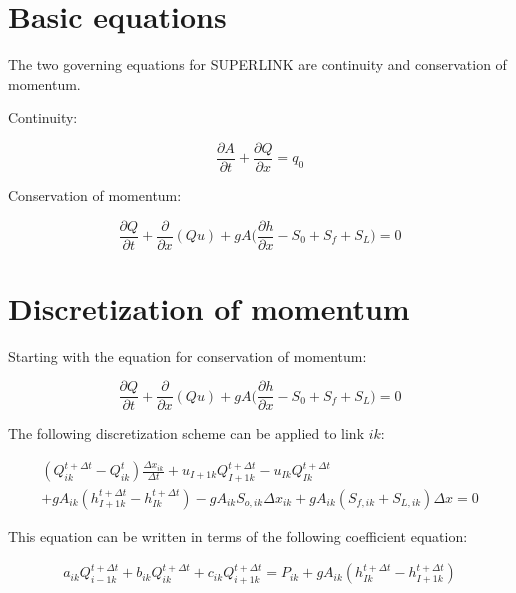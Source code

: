 \documentclass[11pt]{article}
\begin{document}
\clearpage

\section{Basic equations}

The two governing equations for SUPERLINK are continuity and conservation of momentum.

Continuity:

\begin{equation}
  \frac{\partial A}{\partial t} + \frac{\partial Q}{\partial x} = q_0
\end{equation}

Conservation of momentum:

\begin{equation}
  \frac{\partial Q}{\partial t} + \frac{\partial}{\partial x} (Q u) + g A \biggl(\frac{\partial h}{\partial x} - S_0 + S_f + S_L \biggr) = 0
\end{equation}

\section{Discretization of momentum}

Starting with the equation for conservation of momentum:

\begin{equation}
  \frac{\partial Q}{\partial t} + \frac{\partial}{\partial x} (Q u) + g A \biggl(\frac{\partial h}{\partial x} - S_0 + S_f + S_L \biggr) = 0
\end{equation}

The following discretization scheme can be applied to link $ik$:

\begin{equation}
  \begin{split}
    (Q_{ik}^{t + \Delta t} - Q_{ik}^t) \frac{\Delta x_{ik}}{\Delta t} + u_{I+1k}
    Q_{I + 1k}^{t + \Delta t} - u_{Ik} Q_{Ik}^{t + \Delta t} \\
    + g A_{ik} (h_{I+1k}^{t + \Delta t} - h_{Ik}^{t + \Delta t}) 
    - g A_{ik} S_{o,ik} \Delta x_{ik} + g
    A_{ik} (S_{f,ik} + S_{L,ik}) \Delta x = 0
  \end{split}
\end{equation}

This equation can be written in terms of the following coefficient equation:

\begin{equation}
  \boxed{
  \begin{split}
    a_{ik} Q_{i - 1k}^{t + \Delta t} + b_{ik} Q_{ik}^{t + \Delta t} + c_{ik} Q_{i + 1k}^{t + \Delta t} =
    P_{ik} + g A_{ik} (h_{Ik}^{t + \Delta t} - h_{I+1k}^{t + \Delta t})
  \end{split}
  }
\end{equation}
\end{document}
